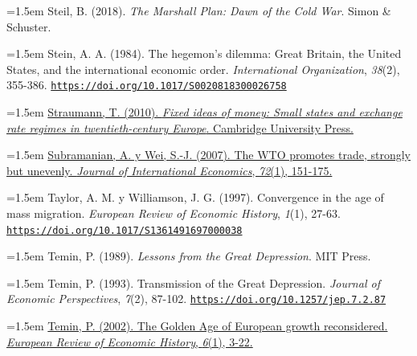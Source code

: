\documentclass[10pt,a4paper]{article}
\begin{document}
{\sloppy\noindent\hangindent=1.5em Steil, B. (2018). \textit{The Marshall Plan: Dawn of the Cold War}. Simon \& Schuster.\par}

{\sloppy\noindent\hangindent=1.5em Stein, A. A. (1984). The hegemon's dilemma: Great Britain, the United States, and the international economic order. \textit{International Organization}, \textit{38}(2), 355-386. \href{https://doi.org/10.1017/S0020818300026758}{\nolinkurl{https://doi.org/10.1017/S0020818300026758}}\par}

{\sloppy\noindent\hangindent=1.5em \href{https://www.cambridge.org/core/books/fixed-ideas-of-money/conclusion/5C1BF9E78DED797AFD97555E36AC7977}{Straumann, T. (2010). \textit{Fixed ideas of money: Small states and exchange rate regimes in twentieth-century Europe}. Cambridge University Press.}\par}

{\sloppy\noindent\hangindent=1.5em \href{https://ideas.repec.org/p/nbr/nberwo/10024.html}{Subramanian, A. y Wei, S.-J. (2007). The WTO promotes trade, strongly but unevenly. \textit{Journal of International Economics}, \textit{72}(1), 151-175.}\par}

{\sloppy\noindent\hangindent=1.5em Taylor, A. M. y Williamson, J. G. (1997). Convergence in the age of mass migration. \textit{European Review of Economic History}, \textit{1}(1), 27-63. \href{https://doi.org/10.1017/S1361491697000038}{\nolinkurl{https://doi.org/10.1017/S1361491697000038}}\par}

{\sloppy\noindent\hangindent=1.5em Temin, P. (1989). \textit{Lessons from the Great Depression}. MIT Press.\par}

{\sloppy\noindent\hangindent=1.5em Temin, P. (1993). Transmission of the Great Depression. \textit{Journal of Economic Perspectives}, \textit{7}(2), 87-102. \href{https://doi.org/10.1257/jep.7.2.87}{\nolinkurl{https://doi.org/10.1257/jep.7.2.87}}\par}

{\sloppy\noindent\hangindent=1.5em \href{https://econpapers.repec.org/RePEc:cup:ereveh:v:6:y:2002:i:01:p:3-22_00}{Temin, P. (2002). The Golden Age of European growth reconsidered. \textit{European Review of Economic History}, \textit{6}(1), 3-22.}\par}
\end{document}

